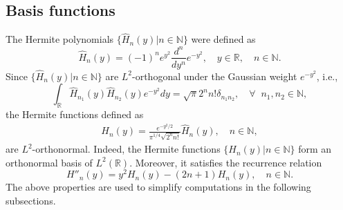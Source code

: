 \documentclass[1 [leqno, 11pt]{amsart}
\numberwithin{equation}{section}
\begin{document}
\begin{CJK*}{GBK}{song}
\subsection{Basis functions}
The Hermite polynomials $\{\hat{H}_n(y) | n \in \mathbb{N} \}$ were defined as
$$\hat{H}_n(y)=(-1)^ne^{y^2}\frac{d^n}{dy^n}e^{-y^2},\quad y \in \mathbb{R}, \quad n \in \mathbb{N}.$$
Since $\{\hat{H}_n(y) | n \in \mathbb{N} \}$ are $L^2$-orthogonal under the Gaussian weight $e^{-y^2}$, i.e.,
$$\int_{\mathbb{R}} \hat{H}_{n_1}(y) \hat{H}_{n_2}(y) e^{-y^2} dy = \sqrt{\pi}2^n n! \delta_{n_1 n_2}, \quad\forall\;\; n_1, n_2 \in \mathbb{N}, $$
the Hermite functions defined as
\begin{align*}
H_n(y)= \frac{e^{-y^2/2}}{\pi^{1/4}\sqrt{2^nn!}}\hat{H}_n(y), \quad n \in \mathbb{N},
\end{align*}
are $L^2$-orthonormal.
Indeed, the Hermite functions $\{H_n(y) | n \in \mathbb{N} \}$ form an orthonormal basis of $L^2(\mathbb{R})$. Moreover, it satisfies the recurrence relation
$$H''_n(y) = y^2 H_n(y) -(2n + 1)H_n(y),\quad n\in \mathbb{N}.$$
The above properties are used to simplify  computations in the following subsections.
\fi


\end{CJK*}
\end{document}

